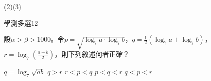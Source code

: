 \begin{QUESTIONS}
\begin{QUESTION}
\begin{QBODY}
        \end{QBODY}
        \begin{QFROMS}
        \end{QFROMS}
        \begin{QTAGS}\end{QTAGS}
        \begin{QANS}
            (2)(3)
        \end{QANS}
        \begin{QSOLLIST}
        \end{QSOLLIST}
        \begin{QEMPTYSPACE}
        \end{QEMPTYSPACE}
    \end{QUESTION}
    \begin{QUESTION}
        \begin{ExamInfo}{85}{學測}{多選}{12}
        \end{ExamInfo}
        \begin{ExamAnsRateInfo}{}{}{}{}
        \end{ExamAnsRateInfo}
        \begin{QBODY}
            	設$\alpha >\beta >1000$。令$p=\sqrt{{{\log }_{7}}a\cdot {{\log }_{7}}b}$，$q=\frac{1}{2}\left( {{\log }_{7}}a+{{\log }_{7}}b \right)$，$r={{\log }_{7}}\left( \frac{a+b}{2} \right)$，則下列敘述何者正確？
            \begin{QOPS} 
 \QOP$q={{\log }_{7}}\sqrt{ab}$
            \QOP$q>r$
            \QOP$r<p<q$
            \QOP$p<q<r$
            \QOP$q<p<r$
            \end{QOPS}            
            

\end{QBODY}
\end{QUESTION}
\end{QUESTIONS}
